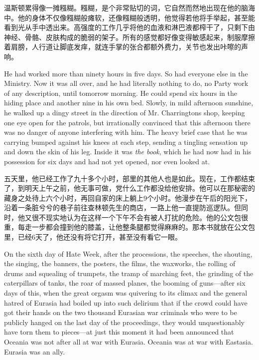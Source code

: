 \begin{paracol}{2}
\switchcolumn

温斯顿累得像一摊糨糊。糨糊，是个非常贴切的词，它自然而然地出现在他的脑海中。他的身体不仅像糨糊般瘫软，还像糨糊般透明，他觉得若他将手举起，甚至能看到光从手中透出来。高强度的工作几乎将他的血液和淋巴液都榨干了，只剩下由神经、骨骼、皮肤构成的脆弱的架子。所有的感觉都好像变得敏感起来，制服摩擦着肩膀，人行道让脚底发痒，就连手掌的张合都额外费力，关节也发出咔嚓的声响。

\switchcolumn*

He had worked more than ninety hours in five days. So had everyone else
in the Ministry. Now it was all over, and he had literally nothing to
do, no Party work of any description, until tomorrow morning. He could
spend six hours in the hiding place and another nine in his own bed.
Slowly, in mild afternoon sunshine, he walked up a dingy street in the
direction of Mr. Charrington\textquotesingle s shop, keeping one eye
open for the patrols, but irrationally convinced that this afternoon
there was no danger of anyone interfering with him. The heavy brief case
that he was carrying bumped against his knees at each step, sending a
tingling sensation up and down the skin of his leg. Inside it was
\emph{the book}, which he had now had in his possession for six days and
had not yet opened, nor even looked at.

\switchcolumn

五天里，他已经工作了九十多个小时，部里的其他人也是如此。现在，工作都结束了，到明天上午之前，他无事可做，党什么工作都没给他安排。他可以在那秘密的藏身之处待上六个小时，再回自家的床上躺上9个小时。他漫步在午后的阳光下，沿着一条脏兮兮的巷子前往查林顿先生的商店，一路上他一直提防巡逻队。但同时，他又很不现实地认为在这样一个下午不会有被人打扰的危险。他的公文包很重，每走一步都会撞到他的膝盖，让他整条腿都觉得麻麻的。那本书就放在公文包里，已经6天了，他还没有将它打开，甚至没有看它一眼。

\switchcolumn*

On the sixth day of Hate Week, after the processions, the speeches, the
shouting, the singing, the banners, the posters, the films, the
waxworks, the rolling of drums and squealing of trumpets, the tramp of
marching feet, the grinding of the caterpillars of tanks, the roar of
massed planes, the booming of guns---after six days of this, when the
great orgasm was quivering to its climax and the general hatred of
Eurasia had boiled up into such delirium that if the crowd could have
got their hands on the two thousand Eurasian war criminals who were to
be publicly hanged on the last day of the proceedings, they would
unquestionably have torn them to pieces---at just this moment it had
been announced that Oceania was not after all at war with Eurasia.
Oceania was at war with Eastasia. Eurasia was an ally.


\end{paracol}

